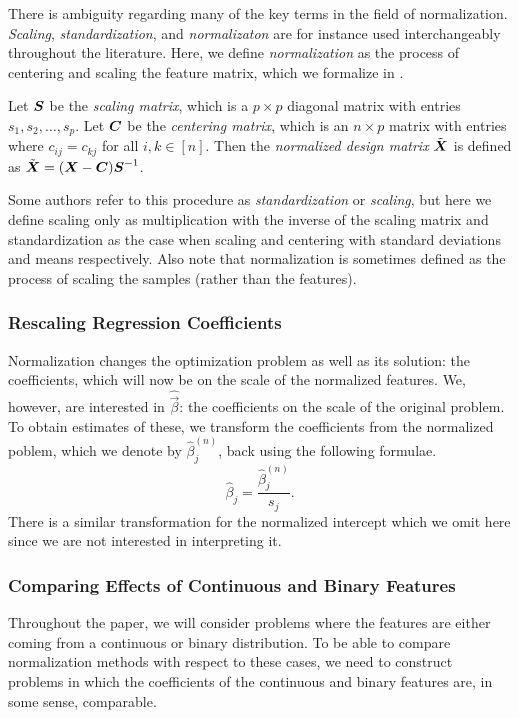 There is ambiguity regarding many of the key terms in the field of normalization. \emph{Scaling}, \emph{standardization}, and \emph{normalizaton} are for instance used interchangeably throughout the literature. Here, we define \emph{normalization} as the process of centering and scaling the feature matrix, which we formalize in .

\begin{definition}[Normalization]
  \label{def:normalization}
  Let \(\boldsymbol S\) be the \emph{scaling matrix}, which is a \(p \times p\) diagonal matrix with entries \(s_1, s_2, \dots, s_p\). Let \(\boldsymbol C\) be the \emph{centering matrix}, which is an \(n \times p\) matrix with entries where \(c_{ij} = c_{kj}\) for all \(i,k \in [n]\). Then the \emph{normalized design matrix} \(\tilde{\boldsymbol X}\) is defined as \(\tilde{\boldsymbol X} = (\boldsymbol X - \boldsymbol C)\boldsymbol S^{-1}\).
\end{definition}

Some authors refer to this procedure as \emph{standardization} or \emph{scaling}, but here we define scaling only as multiplication with the inverse of the scaling matrix and standardization as the case when scaling and centering with standard deviations and means respectively. Also note that normalization is sometimes defined as the process of scaling the samples (rather than the features).

\subsubsection{Rescaling Regression Coefficients}

Normalization changes the optimization problem as well as its solution: the coefficients, which will now be on the scale of the normalized features. We, however, are interested in \(\hat{\vec{\beta}}\): the coefficients on the scale of the original problem. To obtain estimates of these, we transform the coefficients from the normalized poblem, which we denote by \(\hat\beta^{(n)}_j\), back using the following formulae.
\[
  \hat\beta_j = \frac{\hat\beta^{(n)}_j}{s_j}.
\]
There is a similar transformation for the normalized intercept which we omit here since we are not interested in interpreting it.

\subsubsection{Comparing Effects of Continuous and Binary Features}

Throughout the paper, we will consider problems where the features are either coming from a continuous or binary distribution. To be able to compare normalization methods with respect to these cases, we need to construct problems in which the coefficients of the continuous and binary features are, in some sense, comparable.

